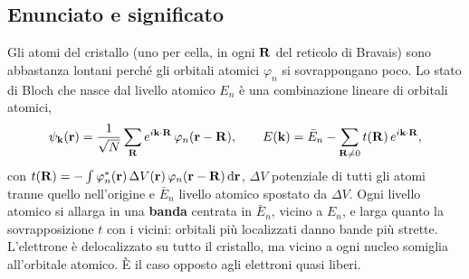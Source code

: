 \documentclass[11pt,a4paper]{article}
\begin{document}
\subsection{Enunciato e significato}
\begin{modello}\label{mod:tb}
Gli atomi del cristallo (uno per cella, in ogni $\mathbf R$ del reticolo di Bravais) sono abbastanza lontani perché gli orbitali atomici $\varphi_n$ si
sovrappongano poco. Lo stato di Bloch che nasce dal livello atomico $E_n$ è una combinazione lineare di orbitali atomici,
\[
\psi_{\mathbf k}(\mathbf r)=\frac1{\sqrt N}\sum_{\mathbf R}e^{i\mathbf k\cdot\mathbf R}\,\varphi_n(\mathbf r-\mathbf R),\qquad
E(\mathbf k)=\bar E_n-\sum_{\mathbf R\ne0}t(\mathbf R)\,e^{i\mathbf k\cdot\mathbf R},
\]
con $t(\mathbf R)=-\int\varphi_n^*(\mathbf r)\,\Delta V(\mathbf r)\,\varphi_n(\mathbf r-\mathbf R)\,\mathrm d\mathbf r$, $\Delta V$ potenziale di tutti gli atomi tranne quello nell'origine e $\bar E_n$
livello atomico spostato da $\Delta V$.
\tcblower
Ogni livello atomico si allarga in una \textbf{banda} centrata in $\bar E_n$, vicino a $E_n$, e larga quanto la sovrapposizione $t$ con i vicini:
orbitali più localizzati danno bande più strette. L'elettrone è delocalizzato su tutto il cristallo, ma vicino a ogni nucleo somiglia all'orbitale
atomico. È il caso opposto agli elettroni quasi liberi.
\end{modello}
\end{document}
